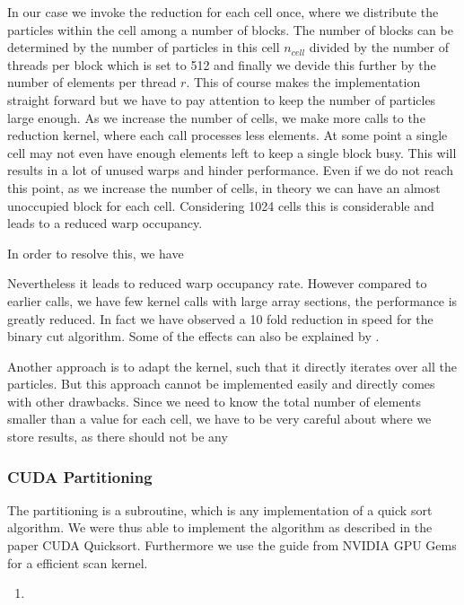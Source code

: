 \documentclass[]{article}
\begin{document}
\begin{itemize}
\end{itemize}

In our case we invoke the reduction for each cell once, where we distribute the particles within the cell among a number of blocks. The number of blocks can be determined by the number of particles in this cell $n_{cell}$ divided by the number of threads per block which is set to 512 and finally we devide this further by the number of elements per thread $r$. This of course makes the implementation straight forward but we have to pay attention to keep the number of particles large enough. As we increase the number of cells, we make more calls to the reduction kernel, where each call processes less elements. At some point a single cell may not even have enough elements left to keep a single block busy. This will results in a lot of unused warps and hinder performance. Even if we do not reach this point, as we increase the number of cells, in theory we can have an almost unoccupied block for each cell. Considering 1024 cells this is considerable and leads to a reduced warp occupancy. 

In order to resolve this, we have 

  Nevertheless it leads to reduced warp occupancy rate. However compared to earlier calls, we have few kernel calls with large array sections, the performance is greatly reduced. In fact we have observed a 10 fold reduction in speed for the binary cut algorithm. Some of the effects can also be explained by  .

Another approach is to adapt the kernel, such that it directly iterates over all the particles. But this approach cannot be implemented easily and directly comes with other drawbacks. Since we need to know the total number of elements smaller than a value for each cell, we have to be very careful about where we store results, as there should not be any 

\subsubsection{CUDA Partitioning}

The partitioning is a subroutine, which is any implementation of a quick sort algorithm. We were thus able to implement the algorithm as described in the paper CUDA Quicksort. Furthermore we use the guide from NVIDIA GPU Gems for a efficient scan kernel. 

\begin{enumerate}
	\item 
\end{enumerate}
\end{document}
